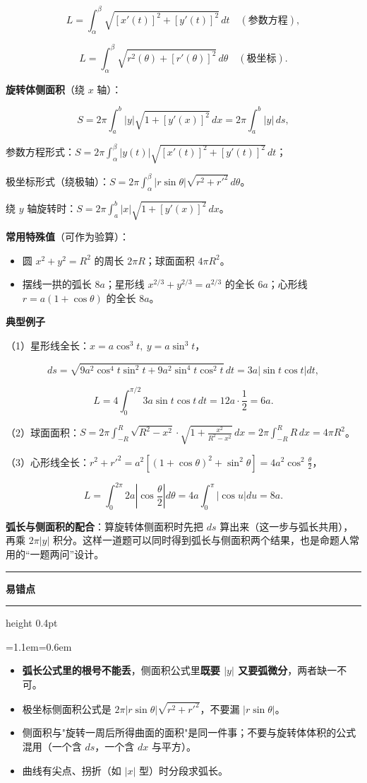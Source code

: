 \documentclass[11pt,openany,UTF8]{ctexbook}
\newcommand{\callouthead}[2]{%
  \par\addvspace{7pt}\noindent
  {\color{#1}\rule[-0.15em]{3pt}{1.05em}}\hspace{0.5em}%
  {\bfseries\color{#1}#2}\par\nobreak\vspace{-0.35em}%
  {\color{rulesep}\hrule height 0.4pt}\nobreak\vspace{0.45em}%
  \begingroup\small\setlength{\parindent}{0pt}%
  \leftskip=1.1em\rightskip=0.6em\noindent\ignorespaces}
\newcommand{\calloutend}{\par\endgroup\addvspace{7pt}}
\newenvironment{callwarn}[1]{\callouthead{warnbar}{#1}}{\calloutend}
\begin{document}
\[L=\int_{\alpha}^{\beta}\sqrt{\left[x'(t)\right]^2+\left[y'(t)\right]^2}\,dt\quad(\text{参数方程}),\]

\[L=\int_{\alpha}^{\beta}\sqrt{r^2(\theta)+\left[r'(\theta)\right]^2}\,d\theta\quad(\text{极坐标}).\]

\textbf{旋转体侧面积}（绕 $x$ 轴）：

\[S=2\pi\int_a^b\lvert y\rvert\sqrt{1+\left[y'(x)\right]^2}\,dx=2\pi\int_a^b\lvert y\rvert\,ds,\]

参数方程形式：$S=2\pi\displaystyle\int_{\alpha}^{\beta}\lvert y(t)\rvert\sqrt{\left[x'(t)\right]^2+\left[y'(t)\right]^2}\,dt$；

极坐标形式（绕极轴）：$S=2\pi\displaystyle\int_{\alpha}^{\beta}\lvert r\sin\theta\rvert\sqrt{r^2+r'^2}\,d\theta$。

绕 $y$ 轴旋转时：$S=2\pi\displaystyle\int_a^b\lvert x\rvert\sqrt{1+\left[y'(x)\right]^2}\,dx$。

\textbf{常用特殊值}（可作为验算）：

\begin{itemize}
\item 圆 $x^2+y^2=R^2$ 的周长 $2\pi R$；球面面积 $4\pi R^2$。
\item 摆线一拱的弧长 $8a$；星形线 $x^{2/3}+y^{2/3}=a^{2/3}$ 的全长 $6a$；心形线 $r=a(1+\cos\theta)$ 的全长 $8a$。
\end{itemize}
\textbf{典型例子}

（1）星形线全长：$x=a\cos^3t,\ y=a\sin^3t$，

\[ds=\sqrt{9a^2\cos^4t\sin^2t+9a^2\sin^4t\cos^2t}\,dt=3a\lvert\sin t\cos t\rvert dt,\]

\[L=4\int_0^{\pi/2}3a\sin t\cos t\,dt=12a\cdot\frac{1}{2}=6a.\]

（2）球面面积：$S=2\pi\displaystyle\int_{-R}^{R}\sqrt{R^2-x^2}\cdot\sqrt{1+\frac{x^2}{R^2-x^2}}\,dx=2\pi\int_{-R}^{R}R\,dx=4\pi R^2$。

（3）心形线全长：$r^2+r'^2=a^2\left[(1+\cos\theta)^2+\sin^2\theta\right]=4a^2\cos^2\frac{\theta}{2}$，

\[L=\int_0^{2\pi}2a\left\lvert\cos\frac{\theta}{2}\right\rvert d\theta=4a\int_0^{\pi}\lvert\cos u\rvert du=8a.\]

\textbf{弧长与侧面积的配合}：算旋转体侧面积时先把 $ds$ 算出来（这一步与弧长共用），再乘 $2\pi\lvert y\rvert$ 积分。这样一道题可以同时得到弧长与侧面积两个结果，也是命题人常用的“一题两问”设计。

\begin{callwarn}{易错点}
\begin{itemize}
\item \textbf{弧长公式里的根号不能丢}，侧面积公式里\textbf{既要 $\lvert y\rvert$ 又要弧微分}，两者缺一不可。
\item 极坐标侧面积公式是 $2\pi\lvert r\sin\theta\rvert\sqrt{r^2+r'^2}$，不要漏 $\lvert r\sin\theta\rvert$。
\item 侧面积与"旋转一周后所得曲面的面积"是同一件事；不要与旋转体体积的公式混用（一个含 $ds$，一个含 $dx$ 与平方）。
\item 曲线有尖点、拐折（如 $\lvert x\rvert$ 型）时分段求弧长。
\end{itemize}
\end{callwarn}
\end{document}

